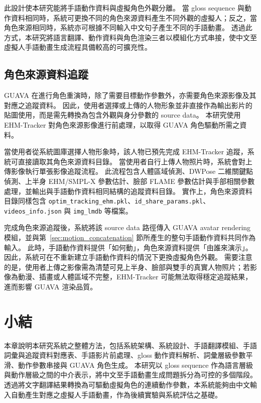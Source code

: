 \documentclass[class=NCU_thesis, crop=false]{standalone}
\begin{document}
此設計使本研究能將手語動作資料與虛擬角色外觀分離。
當 gloss sequence 與動作資料相同時，系統可更換不同的角色來源資料產生不同外觀的虛擬人；反之，當角色來源相同時，系統亦可根據不同輸入中文句子產生不同的手語動畫。
透過此方式，本研究將語言翻譯、動作資料與角色渲染三者以模組化方式串接，使中文至虛擬人手語動畫生成流程具備較高的可擴充性。

\subsection{角色來源資料追蹤}
\label{sec:source_avatar_tracking}

GUAVA 在進行角色重演時，除了需要目標動作參數外，亦需要角色來源影像及其對應之追蹤資料。
因此，使用者選擇或上傳的人物形象並非直接作為輸出影片的貼圖使用，而是需先轉換為包含外觀與身分參數的 source data。
本研究使用 EHM-Tracker 對角色來源影像進行前處理，以取得 GUAVA 角色驅動所需之資料。

當使用者從系統圖庫選擇人物形象時，該人物已預先完成 EHM-Tracker 追蹤，系統可直接讀取其角色來源資料目錄。
當使用者自行上傳人物照片時，系統會對上傳影像執行單張影像追蹤流程。
此流程包含人體區域偵測、DWPose 二維關鍵點偵測、上半身 EHM/SMPL-X 參數估計、臉部 FLAME 參數估計與手部相關參數處理，並輸出與手語動作資料相同結構的追蹤資料目錄。
實作上，角色來源資料目錄同樣包含 \texttt{optim\_tracking\_ehm.pkl}、\texttt{id\_share\_params.pkl}、\texttt{videos\_info.json} 與 \texttt{img\_lmdb} 等檔案。

完成角色來源追蹤後，系統將該 source data 路徑傳入 GUAVA avatar rendering 模組，並與第~\ref{sec:motion_concatenation} 節所產生的整句手語動作資料共同作為輸入。
此時，手語動作資料提供「如何動」，角色來源資料提供「由誰來演示」。
因此，系統可在不重新建立手語動作資料的情況下更換虛擬角色外觀。
需要注意的是，使用者上傳之影像需為清楚可見上半身、臉部與雙手的真實人物照片；若影像為動漫、插畫或人體區域不完整，EHM-Tracker 可能無法取得穩定追蹤結果，進而影響 GUAVA 渲染品質。

\section{小結}

本章說明本研究系統之整體方法，包括系統架構、系統設計、手語翻譯模組、手語詞彙與追蹤資料對應表、手語影片前處理、gloss 動作資料解析、詞彙層級參數平滑、動作參數串接與 GUAVA 角色生成。
本研究以 gloss sequence 作為語言層級與動作層級之間的中介表示，將中文至手語動畫生成問題拆分為可控的多個階段。
透過將文字翻譯結果轉換為可驅動虛擬角色的連續動作參數，本系統能夠由中文輸入自動產生對應之虛擬人手語動畫，作為後續實驗與系統評估之基礎。
\end{document}
